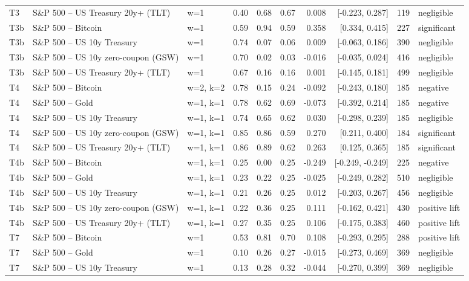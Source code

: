 \begin{figure}
\begin{tabular}{lllrrrrrrl}
T3 & S\&P 500 -- US Treasury 20y+ (TLT) & w=1 & 0.40 & 0.68 & 0.67 & 0.008 & [-0.223, 0.287] & 119 & negligible \\
T3b & S\&P 500 -- Bitcoin & w=1 & 0.59 & 0.94 & 0.59 & 0.358 & [0.334, 0.415] & 227 & significant \\
T3b & S\&P 500 -- US 10y Treasury & w=1 & 0.74 & 0.07 & 0.06 & 0.009 & [-0.063, 0.186] & 390 & negligible \\
T3b & S\&P 500 -- US 10y zero-coupon (GSW) & w=1 & 0.70 & 0.02 & 0.03 & -0.016 & [-0.035, 0.024] & 416 & negligible \\
T3b & S\&P 500 -- US Treasury 20y+ (TLT) & w=1 & 0.67 & 0.16 & 0.16 & 0.001 & [-0.145, 0.181] & 499 & negligible \\
T4 & S\&P 500 -- Bitcoin & w=2, k=2 & 0.78 & 0.15 & 0.24 & -0.092 & [-0.243, 0.180] & 185 & negative \\
T4 & S\&P 500 -- Gold & w=1, k=1 & 0.78 & 0.62 & 0.69 & -0.073 & [-0.392, 0.214] & 185 & negative \\
T4 & S\&P 500 -- US 10y Treasury & w=1, k=1 & 0.74 & 0.65 & 0.62 & 0.030 & [-0.298, 0.239] & 185 & negligible \\
T4 & S\&P 500 -- US 10y zero-coupon (GSW) & w=1, k=1 & 0.85 & 0.86 & 0.59 & 0.270 & [0.211, 0.400] & 184 & significant \\
T4 & S\&P 500 -- US Treasury 20y+ (TLT) & w=1, k=1 & 0.86 & 0.89 & 0.62 & 0.263 & [0.125, 0.365] & 185 & significant \\
T4b & S\&P 500 -- Bitcoin & w=1, k=1 & 0.25 & 0.00 & 0.25 & -0.249 & [-0.249, -0.249] & 225 & negative \\
T4b & S\&P 500 -- Gold & w=1, k=1 & 0.23 & 0.22 & 0.25 & -0.025 & [-0.249, 0.282] & 510 & negligible \\
T4b & S\&P 500 -- US 10y Treasury & w=1, k=1 & 0.21 & 0.26 & 0.25 & 0.012 & [-0.203, 0.267] & 456 & negligible \\
T4b & S\&P 500 -- US 10y zero-coupon (GSW) & w=1, k=1 & 0.22 & 0.36 & 0.25 & 0.111 & [-0.162, 0.421] & 430 & positive lift \\
T4b & S\&P 500 -- US Treasury 20y+ (TLT) & w=1, k=1 & 0.27 & 0.35 & 0.25 & 0.106 & [-0.175, 0.383] & 460 & positive lift \\
T7 & S\&P 500 -- Bitcoin & w=1 & 0.53 & 0.81 & 0.70 & 0.108 & [-0.293, 0.295] & 288 & positive lift \\
T7 & S\&P 500 -- Gold & w=1 & 0.10 & 0.26 & 0.27 & -0.015 & [-0.273, 0.469] & 369 & negligible \\
T7 & S\&P 500 -- US 10y Treasury & w=1 & 0.13 & 0.28 & 0.32 & -0.044 & [-0.270, 0.399] & 369 & negligible \\

\end{tabular}
\end{figure}
